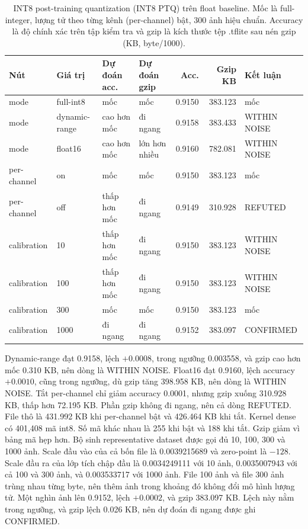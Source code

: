 \documentclass[13pt,a4paper]{article}
\begin{document}
\begin{table}[H]
\centering
\caption{INT8 post-training quantization (INT8 PTQ) trên float baseline. Mốc là full-integer, lượng tử theo từng kênh (per-channel) bật, 300 ảnh hiệu chuẩn. Accuracy là độ chính xác trên tập kiểm tra và gzip là kích thước tệp .tflite sau nén gzip (KB, byte/1000).}
\label{tab:sweep-int8}
\begin{tabular}{|l|l|l|l|r|r|l|}
\hline
Nút & Giá trị & Dự đoán acc. & Dự đoán gzip & Acc. & Gzip KB & Kết luận \\ \hline
mode & full-int8 & mốc & mốc & 0.9150 & 383.123 & mốc \\ \hline
mode & dynamic-range & cao hơn mốc & đi ngang & 0.9158 & 383.433 & WITHIN NOISE \\ \hline
mode & float16 & cao hơn mốc & lớn hơn nhiều & 0.9160 & 782.081 & WITHIN NOISE \\ \hline
per-channel & on & mốc & mốc & 0.9150 & 383.123 & mốc \\ \hline
per-channel & off & thấp hơn mốc & đi ngang & 0.9149 & 310.928 & REFUTED \\ \hline
calibration & 10 & thấp hơn mốc & đi ngang & 0.9150 & 383.123 & WITHIN NOISE \\ \hline
calibration & 100 & thấp hơn mốc & đi ngang & 0.9150 & 383.123 & WITHIN NOISE \\ \hline
calibration & 300 & mốc & mốc & 0.9150 & 383.123 & mốc \\ \hline
calibration & 1000 & đi ngang & đi ngang & 0.9152 & 383.097 & CONFIRMED \\ \hline
\end{tabular}
\end{table}

Dynamic-range đạt 0.9158, lệch \(+0.0008\), trong ngưỡng 0.003558, và gzip cao hơn mốc 0.310 KB, nên dòng là WITHIN NOISE.
Float16 đạt 0.9160, lệch accuracy \(+0.0010\), cũng trong ngưỡng, dù gzip tăng 398.958 KB, nên dòng là WITHIN NOISE.
Tắt per-channel chỉ giảm accuracy 0.0001, nhưng gzip xuống 310.928 KB, thấp hơn 72.195 KB.
Phần gzip không đi ngang, nên cả dòng REFUTED.
File thô là 431.992 KB khi per-channel bật và 426.464 KB khi tắt.
Kernel dense có 401{,}408 mã int8.
Số mã khác nhau là 255 khi bật và 188 khi tắt.
Gzip giảm vì bảng mã hẹp hơn.
Bộ sinh representative dataset được gọi đủ 10, 100, 300 và 1000 ảnh.
Scale đầu vào của cả bốn file là 0.0039215689 và zero-point là \(-128\).
Scale đầu ra của lớp tích chập đầu là 0.0034249111 với 10 ảnh, 0.0035007943 với cả 100 và 300 ảnh, và 0.003533717 với 1000 ảnh.
File 100 ảnh và file 300 ảnh trùng nhau từng byte, nên thêm ảnh trong khoảng đó không đổi mô hình lượng tử.
Một nghìn ảnh lên 0.9152, lệch \(+0.0002\), và gzip 383.097 KB.
Lệch này nằm trong ngưỡng, và gzip lệch 0.026 KB, nên dự đoán đi ngang được ghi CONFIRMED.
\end{document}
